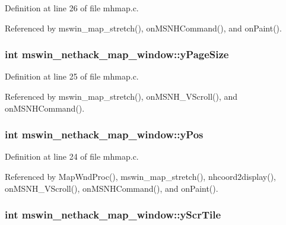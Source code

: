 Definition at line 26 of file mhmap.\+c.



Referenced by mswin\+\_\+map\+\_\+stretch(), on\+M\+S\+N\+H\+Command(), and on\+Paint().

\hypertarget{structmswin__nethack__map__window_a7eaf7cff55b2d986cba8ac01ef07b9a4}{
\subsubsection[{y\+Page\+Size}]{\setlength{\rightskip}{0pt plus 5cm}int mswin\+\_\+nethack\+\_\+map\+\_\+window\+::y\+Page\+Size}}\label{structmswin__nethack__map__window_a7eaf7cff55b2d986cba8ac01ef07b9a4}


Definition at line 25 of file mhmap.\+c.



Referenced by mswin\+\_\+map\+\_\+stretch(), on\+M\+S\+N\+H\+\_\+\+V\+Scroll(), and on\+M\+S\+N\+H\+Command().

\hypertarget{structmswin__nethack__map__window_a65f28fb66beee69ef2502198c8ed01ee}{
\subsubsection[{y\+Pos}]{\setlength{\rightskip}{0pt plus 5cm}int mswin\+\_\+nethack\+\_\+map\+\_\+window\+::y\+Pos}}\label{structmswin__nethack__map__window_a65f28fb66beee69ef2502198c8ed01ee}


Definition at line 24 of file mhmap.\+c.



Referenced by Map\+Wnd\+Proc(), mswin\+\_\+map\+\_\+stretch(), nhcoord2display(), on\+M\+S\+N\+H\+\_\+\+V\+Scroll(), on\+M\+S\+N\+H\+Command(), and on\+Paint().

\hypertarget{structmswin__nethack__map__window_a9d566860974e604deb3eab13900fa5e7}{
\subsubsection[{y\+Scr\+Tile}]{\setlength{\rightskip}{0pt plus 5cm}int mswin\+\_\+nethack\+\_\+map\+\_\+window\+::y\+Scr\+Tile}}\label{structmswin__nethack__map__window_a9d566860974e604deb3eab13900fa5e7}


